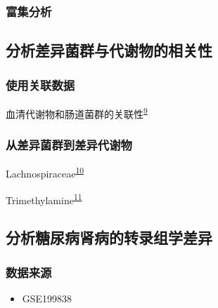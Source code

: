 \documentclass[
]{article}
\providecommand{\tightlist}{%
  \setlength{\itemsep}{0pt}\setlength{\parskip}{0pt}}
\begin{document}
\hypertarget{ux5bccux96c6ux5206ux6790}{%
\subsubsection{富集分析}\label{ux5bccux96c6ux5206ux6790}}

\hypertarget{ux5206ux6790ux5deeux5f02ux83ccux7fa4ux4e0eux4ee3ux8c22ux7269ux7684ux76f8ux5173ux6027}{%
\subsection{分析差异菌群与代谢物的相关性}\label{ux5206ux6790ux5deeux5f02ux83ccux7fa4ux4e0eux4ee3ux8c22ux7269ux7684ux76f8ux5173ux6027}}

\hypertarget{ux4f7fux7528ux5173ux8054ux6570ux636e}{%
\subsubsection{使用关联数据}\label{ux4f7fux7528ux5173ux8054ux6570ux636e}}

血清代谢物和肠道菌群的关联性\textsuperscript{\protect\hyperlink{ref-BloodMetabolomWilman2019}{9}}

\hypertarget{ux4eceux5deeux5f02ux83ccux7fa4ux5230ux5deeux5f02ux4ee3ux8c22ux7269}{%
\subsubsection{从差异菌群到差异代谢物}\label{ux4eceux5deeux5f02ux83ccux7fa4ux5230ux5deeux5f02ux4ee3ux8c22ux7269}}

Lachnospiraceae\textsuperscript{\protect\hyperlink{ref-TheControversiVacca2020}{10}}

Trimethylamine\textsuperscript{\protect\hyperlink{ref-TheRoleOfAGPravee2022}{11}}

\hypertarget{ux5206ux6790ux7cd6ux5c3fux75c5ux80beux75c5ux7684ux8f6cux5f55ux7ec4ux5b66ux5deeux5f02}{%
\subsection{分析糖尿病肾病的转录组学差异}\label{ux5206ux6790ux7cd6ux5c3fux75c5ux80beux75c5ux7684ux8f6cux5f55ux7ec4ux5b66ux5deeux5f02}}

\hypertarget{ux6570ux636eux6765ux6e90-1}{%
\subsubsection{数据来源}\label{ux6570ux636eux6765ux6e90-1}}

\begin{itemize}
\tightlist
\item
  GSE199838
\end{itemize}
\end{document}
